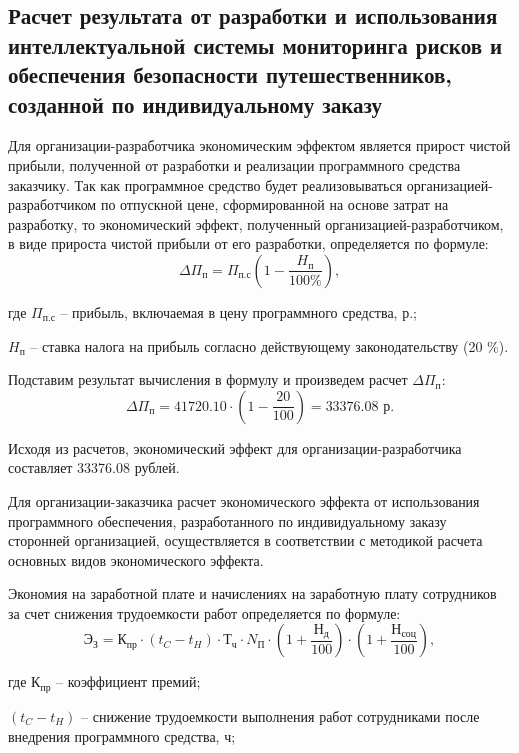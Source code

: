 \subsection{Расчет результата от разработки и использования интеллектуальной системы мониторинга рисков и обеспечения безопасности путешественников, созданной по индивидуальному заказу}

Для организации-разработчика экономическим эффектом является прирост чистой прибыли, полученной от разработки и реализации программного средства заказчику. Так как программное средство будет реализовываться организацией-разработчиком по отпускной цене, сформированной на основе затрат на разработку, то экономический эффект, полученный организацией-разработчиком, в виде прироста чистой прибыли от его разработки, определяется по формуле:
\begin{equation}
    \Delta\Pi_{\text{п}} = \Pi_{\text{п.с}}(1-\frac{H_{\text{п}}}{100\%}),
\end{equation}

где $\Pi_{\text{п.с}}$ -- прибыль, включаемая в цену программного средства, р.;

    $H_{\text{п}}$ -- ставка налога на прибыль согласно действующему законодательству (20 \%).

Подставим результат вычисления в формулу и произведем расчет $\Delta\Pi_{\text{п}}$:
$$
    \Delta\Pi_{\text{п}} = 41720.10 \cdot (1 - \frac{20}{100}) = 33376.08 \text{ р}.
$$

Исходя из расчетов, экономический эффект для организации-разработчика составляет 33376.08 рублей.

Для организации-заказчика расчет экономического эффекта от использования программного обеспечения, разработанного по индивидуальному заказу сторонней организацией, осуществляется в соответствии с методикой расчета основных видов экономического эффекта.

Экономия на заработной плате и начислениях на заработную плату сотрудников за счет снижения трудоемкости работ определяется по формуле:
\begin{equation}
    \text{Э}_{\text{З}} = \text{К}_{\text{пр}}\cdot (t_{C}-t_{H})\cdot \text{Т}_{\text{ч}}\cdot N_{\text{П}}\cdot  (1+\frac{\text{Н}_{\text{д}}}{100})\cdot (1+\frac{\text{Н}_{\text{соц}}}{100}),
\end{equation}

где $\text{К}_{\text{пр}}$ -- коэффициент премий;

    $(t_{C}-t_{H})$ -- снижение трудоемкости выполнения работ сотрудниками после внедрения программного средства, ч;


